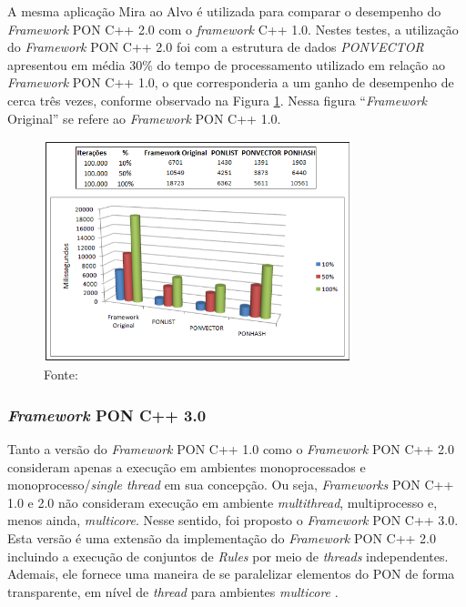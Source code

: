 \FloatBarrier

A mesma aplicação Mira ao Alvo é utilizada para comparar o desempenho do
\textit{Framework} PON C++ 2.0 com o \textit{framework} C++ 1.0. Nestes testes, a
utilização do \textit{Framework} PON C++ 2.0 foi com a estrutura de dados
\textit{PONVECTOR} apresentou em média 30\% do tempo de processamento utilizado
em relação ao \textit{Framework} PON C++ 1.0, o que corresponderia a um ganho de
desempenho de cerca três vezes, conforme observado na Figura
\ref{fig:fw2_vs_fw1}. Nessa figura \enquote{\textit{Framework} Original} se refere  ao
\textit{Framework} PON C++ 1.0.

\begin{figure}[!htb]
  \centering
  \caption{Comparação do desempenho do \textit{Framework} PON C++ 2.0 com o
  \textit{Framework} PON C++ 1.0}
  \includegraphics[width=0.8\textwidth]{../figures/fw2_vs_fw1.png}
  \caption*{Fonte: }
  \label{fig:fw2_vs_fw1}
\end{figure}

\subsubsection{\textit{Framework} PON C++ 3.0}\label{sec:fw3}

Tanto a versão do \textit{Framework} PON C++ 1.0 como o \textit{Framework} PON
C++ 2.0 consideram apenas a execução em ambientes monoprocessados e
monoprocesso/\textit{single thread} em sua concepção. Ou seja, \textit{Frameworks}
PON C++ 1.0 e 2.0 não consideram execução em ambiente \textit{multithread},
multiprocesso e, menos ainda, \textit{multicore}. Nesse sentido, foi proposto o
\textit{Framework} PON C++ 3.0. Esta versão é uma extensão da implementação do
\textit{Framework} PON C++ 2.0 incluindo a execução de conjuntos de
\textit{Rules} por meio de \textit{threads} independentes. Ademais, ele fornece
uma maneira de se paralelizar elementos do PON de forma transparente, em nível
de \textit{thread} para ambientes \textit{multicore} \cite{belmonte_2012}.

